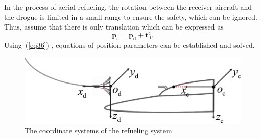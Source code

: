 In the process of aerial refueling, the rotation between the receiver
aircraft and the drogue is limited in a small range to ensure the safety,
which can be ignored. Thus, assume that there is only translation which can
be expressed as 
\begin{equation}
\mathbf{p}_{\mathrm{c}}=\mathbf{p}_{\mathrm{d}}+\mathbf{t}_{\mathrm{d}}^{\mathrm{c}}.  \label{eq36}
\end{equation}
Using~(\ref{eq36}) , equations of position parameters can be established and solved. 
\begin{figure}[!htb]
	\centering
	\includegraphics[width=0.6\hsize]{Figures/Figs_Ch6/refueling2.eps}
	\caption{The coordinate systems of the refueling system \cite{Zhang1}}
	\label{fig3}
\end{figure}


